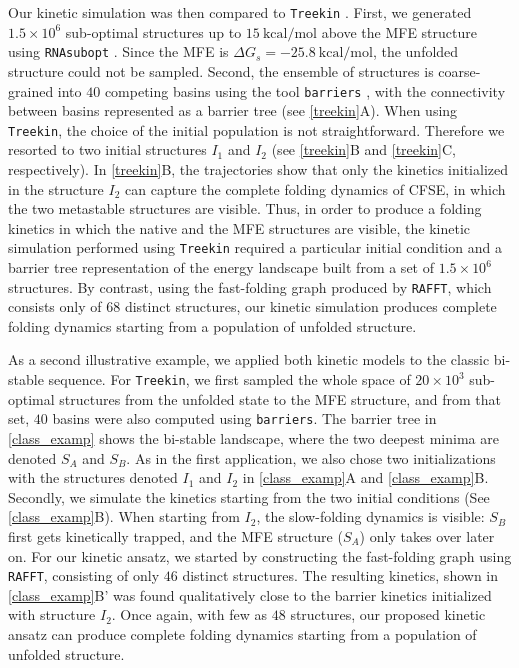 Our kinetic simulation was then compared to \texttt{Treekin} \cite{flamm02_barrier_trees_degen_lands}. First, we generated \(1.5 \times 10^6\) sub-optimal structures up to $15 \ \textrm{kcal/mol}$ above the \ac{MFE} structure using \texttt{RNAsubopt} \cite{lorenz11_vienn_packag}. Since the \ac{MFE} is $\Delta G_s=-25.8 \ \textrm{kcal/mol}$, the unfolded structure could not be sampled. Second, the ensemble of structures is coarse-grained into $40$ competing basins using the tool \texttt{barriers} \cite{flamm02_barrier_trees_degen_lands}, with the connectivity between basins represented as a barrier tree (see \autoref{treekin}A). When using \texttt{Treekin}, the choice of the initial population is not straightforward. Therefore we resorted to two initial structures $I_1$ and $I_2$ (see \autoref{treekin}B and \ref{treekin}C, respectively). In \autoref{treekin}B, the trajectories show that only the kinetics initialized in the structure $I_2$ can capture the complete folding dynamics of \ac{CFSE}, in which the two metastable structures are visible. Thus, in order to produce a folding kinetics in which the native and the \ac{MFE} structures are visible, the kinetic simulation performed using \texttt{Treekin} required a particular initial condition and a barrier tree representation of the energy landscape built from a set of  $1.5 \times 10^6$ structures. By contrast, using the fast-folding graph produced by \texttt{RAFFT}, which consists only of $68$ distinct structures, our kinetic simulation produces complete folding dynamics starting from a population of unfolded structure.

As a second illustrative example, we applied both kinetic models to the classic bi-stable sequence. For \texttt{Treekin}, we first sampled the whole space of \(20 \times 10^3\) sub-optimal structures from the unfolded state to the \ac{MFE} structure, and from that set, $40$ basins were also computed using \texttt{barriers}. The barrier tree in \autoref{class_examp} shows the bi-stable landscape, where the two deepest minima are denoted $S_A$ and $S_B$. As in the first application, we also chose two initializations with the structures denoted $I_1$ and $I_2$ in \autoref{class_examp}A and \ref{class_examp}B. Secondly, we simulate the kinetics starting from the two initial conditions (See \autoref{class_examp}B). When starting from $I_2$, the slow-folding dynamics is visible:  $S_B$ first gets kinetically trapped, and the \ac{MFE} structure ($S_A$) only takes over later on. For our kinetic ansatz, we started by constructing the fast-folding graph using \texttt{RAFFT}, consisting of only $46$ distinct structures. The resulting kinetics, shown in \autoref{class_examp}B' was found qualitatively close to the barrier kinetics initialized with structure $I_2$. Once again, with few as $48$ structures, our proposed kinetic ansatz can produce complete folding dynamics starting from a population of unfolded structure.

